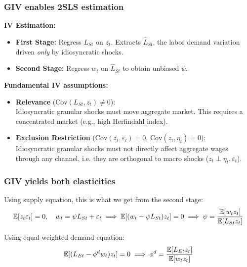 \documentclass[aspectratio=169,11pt]{beamer}
\begin{document}
\begin{frame}
    \frametitle{GIV enables 2SLS estimation}
    \large{\textbf{IV Estimation:}}
    \begin{itemize}
        \item {\textbf{First Stage:} Regress $L_{St}$ on $z_t$. Extracts $\widehat{L}_{St}$, the labor demand variation driven \emph{only} by idiosyncratic shocks.}
        \item {\textbf{Second Stage:} Regress $w_t$ on $\widehat{L}_{St}$ to obtain unbiased $\psi$.}
    \end{itemize}

    {
    \large{\textbf{Fundamental IV assumptions:}}
    }
    \begin{itemize}
        \item {\textbf{Relevance} ($\text{Cov}(L_{St}, z_t) \neq 0$):}\\
              Idiosyncratic granular shocks must move aggregate market. This requires a concentrated market (e.g., high Herfindahl index).

        \item {\textbf{Exclusion Restriction} ($\text{Cov}(z_t, \varepsilon_t) = 0$, $\text{Cov}(z_t, \eta_t) = 0$):}\\
              Idiosyncratic granular shocks must not directly affect aggregate wages through any channel, i.e. they are orthogonal to macro shocks ($z_t \perp \eta_t, \varepsilon_t$).
    \end{itemize}

\end{frame}

\begin{frame} \label{src_psi_identification}
    \frametitle{GIV yields both elasticities}


    \vspace{0.5cm}
    Using supply equation, this is what we get from the second stage:
    \begin{align*}
        \mathbb{E}[z_t \varepsilon_t] = 0, \quad w_t = \psi L_{St} + \varepsilon_t \implies \mathbb{E}[(w_t - \psi L_{St}) z_t] = 0 \implies \psi = \frac{\mathbb{E}[w_t z_t]}{\mathbb{E}[L_{St} z_t]} \notag
    \end{align*}

    \vspace{0.5cm}
    Using equal-weighted demand equation: \hyperlink{app_psi_identification}{}
    \begin{align*}
        \mathbb{E}[(L_{Et} - \phi^d w_t) z_t] = 0 \implies \phi^d = \frac{\mathbb{E}[L_{Et} z_t]}{\mathbb{E}[w_t z_t]} \notag
    \end{align*}

\end{frame}
\end{document}

